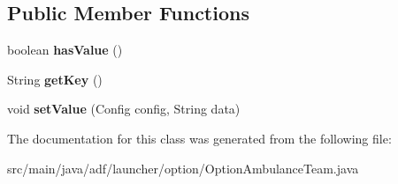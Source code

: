 \subsection*{Public Member Functions}
\begin{DoxyCompactItemize}
\item 
\hypertarget{classadf_1_1launcher_1_1option_1_1OptionAmbulanceTeam_a73e78e0e360656e923347cfab4f07bda}{}\label{classadf_1_1launcher_1_1option_1_1OptionAmbulanceTeam_a73e78e0e360656e923347cfab4f07bda} 
boolean {\bfseries has\+Value} ()
\item 
\hypertarget{classadf_1_1launcher_1_1option_1_1OptionAmbulanceTeam_a0aa64e1f9f3fb5223e36523bb1bbd379}{}\label{classadf_1_1launcher_1_1option_1_1OptionAmbulanceTeam_a0aa64e1f9f3fb5223e36523bb1bbd379} 
String {\bfseries get\+Key} ()
\item 
\hypertarget{classadf_1_1launcher_1_1option_1_1OptionAmbulanceTeam_a715b5524090e6b461afe193bdd7381b4}{}\label{classadf_1_1launcher_1_1option_1_1OptionAmbulanceTeam_a715b5524090e6b461afe193bdd7381b4} 
void {\bfseries set\+Value} (Config config, String data)
\end{DoxyCompactItemize}


The documentation for this class was generated from the following file\+:\begin{DoxyCompactItemize}
\item 
src/main/java/adf/launcher/option/Option\+Ambulance\+Team.\+java\end{DoxyCompactItemize}
